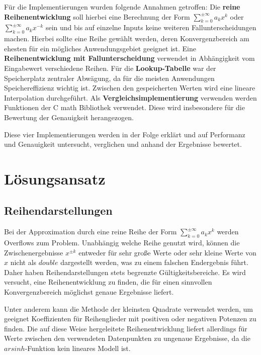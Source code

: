 \documentclass[course=erap] {aspdoc}
\begin{document}
    Für die Implementierungen wurden folgende Annahmen getroffen:
    Die \textbf{reine Reihenentwicklung} soll hierbei eine Berechnung der Form $\sum_{k=0}^{\pm\infty} a_k x^k$ oder $\sum_{k=0}^{\pm\infty} a_k x^{-k}$ sein und bis auf einzelne Inputs keine weiteren Fallunterscheidungen machen.
    Hierbei sollte eine Reihe gewählt werden, deren Konvergenzbereich am ehesten für ein mögliches Anwendungsgebiet geeignet ist.
    Eine \textbf{Reihenentwicklung mit Fallunterscheidung} verwendet in Abhängigkeit vom Eingabewert verschiedene Reihen.
    Für die \textbf{Lookup-Tabelle} war der Speicherplatz zentraler Abwägung, da für die meisten Anwendungen Speichereffizienz wichtig ist.
    Zwischen den gespeicherten Werten wird eine lineare Interpolation durchgeführt.
    Als \textbf{Vergleichsimplementierung} verwenden werden Funktionen der C math Bibliothek verwendet.
    Diese wird insbesondere für die Bewertung der Genauigkeit herangezogen.

    Diese vier Implementierungen werden in der Folge erklärt und auf Performanz und Genauigkeit untersucht, verglichen und anhand der Ergebnisse bewertet.


    \section{Lösungsansatz}\label{sec:losungsansatz}
    \subsection{Reihendarstellungen}\label{subsec:reihendarstellung}

    Bei der Approximation durch eine reine Reihe der Form $\sum_{k=0}^{\pm\infty} a_k x^k$ werden Overflows zum Problem.
    Unabhängig welche Reihe genutzt wird, können die Zwischenergebnisse $x^{\pm k}$ entweder für sehr große Werte oder sehr kleine Werte von $x$ nicht als $double$ dargestellt werden, was zu einem falschen Endergebnis führt.
    Daher haben Reihendarstellungen stets begrenzte Gültigkeitsbereiche.
    Es wird versucht, eine Reihenentwicklung zu finden, die für einen sinnvollen Konvergenzbereich möglichst genaue Ergebnisse liefert.

    Unter anderem kann die Methode der kleinsten Quadrate verwendet werden, um geeignet Koeffizienten für Reihenglieder mit positiven oder negativen Potenzen zu finden.
    Die auf diese Weise hergeleitete Reihenentwicklung liefert allerdings für Werte zwischen den verwendeten Datenpunkten zu ungenaue Ergebnisse, da die $arsinh$-Funktion kein lineares Modell ist.
\end{document}
